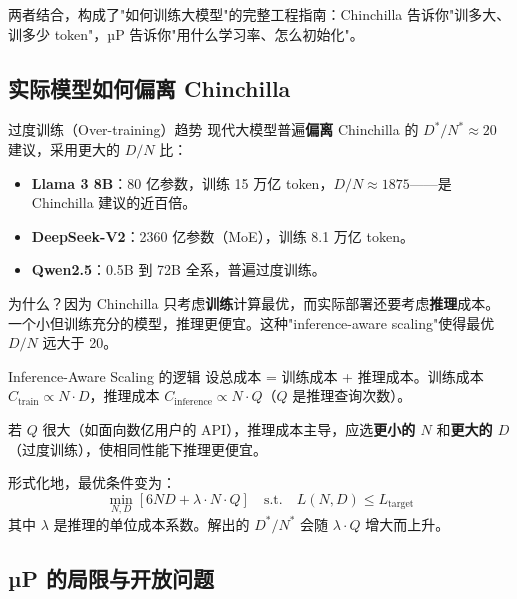 \documentclass[a4paper]{article}
\begin{document}
\vspace{0.3cm}

两者结合，构成了"如何训练大模型"的完整工程指南：Chinchilla 告诉你"训多大、训多少 token"，µP 告诉你"用什么学习率、怎么初始化"。

\subsection{实际模型如何偏离 Chinchilla}

\begin{warningbox}{过度训练（Over-training）趋势}
现代大模型普遍\textbf{偏离} Chinchilla 的 $D^*/N^* \approx 20$ 建议，采用更大的 $D/N$ 比：
\begin{itemize}
\item \textbf{Llama 3 8B}：80 亿参数，训练 15 万亿 token，$D/N \approx 1875$——是 Chinchilla 建议的近百倍。
\item \textbf{DeepSeek-V2}：2360 亿参数（MoE），训练 8.1 万亿 token。
\item \textbf{Qwen2.5}：0.5B 到 72B 全系，普遍过度训练。
\end{itemize}

为什么？因为 Chinchilla 只考虑\textbf{训练}计算最优，而实际部署还要考虑\textbf{推理}成本。一个小但训练充分的模型，推理更便宜。这种"inference-aware scaling"使得最优 $D/N$ 远大于 20。
\end{warningbox}

\begin{importantbox}{Inference-Aware Scaling 的逻辑}
设总成本 = 训练成本 + 推理成本。训练成本 $C_{\text{train}} \propto N \cdot D$，推理成本 $C_{\text{inference}} \propto N \cdot Q$（$Q$ 是推理查询次数）。

若 $Q$ 很大（如面向数亿用户的 API），推理成本主导，应选\textbf{更小的 $N$} 和\textbf{更大的 $D$}（过度训练），使相同性能下推理更便宜。

形式化地，最优条件变为：
\[
\min_{N, D} \left[ 6ND + \lambda \cdot N \cdot Q \right] \quad \text{s.t.} \quad L(N, D) \leq L_{\text{target}}
\]
其中 $\lambda$ 是推理的单位成本系数。解出的 $D^*/N^*$ 会随 $\lambda \cdot Q$ 增大而上升。
\end{importantbox}

\subsection{µP 的局限与开放问题}
\end{document}

